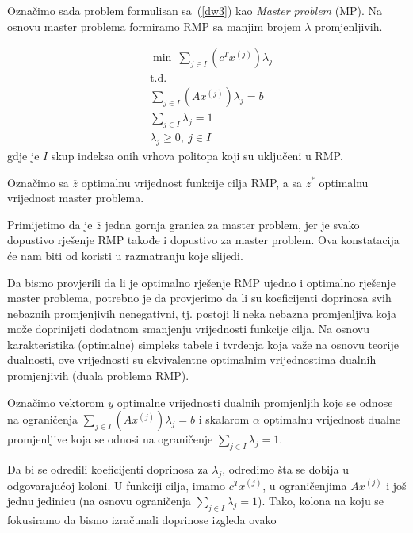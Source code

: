 \documentclass[b5paper, utf8, 11pt, colorlinks]{book}
\theoremstyle{definition}
\begin{document}
 Označimo sada problem formulisan  sa~(\ref{dw3}) kao \emph{Master problem} (MP). Na osnovu master problema formiramo RMP sa manjim brojem $\lambda$ promjenljivih.
 
     \begin{equation}
 	\begin{aligned}\label{dw4}
 		&\min\   \sum_{j\in I}(c^T x^{(j)})\lambda_j\\
 		&\mbox{t.d.}\\ 
 		 &\sum_{j\in I} (A x^{(j)})\lambda_j=b\\
 		&\sum_{j\in I}\lambda_j = 1\\
 		&\lambda_j\geqslant 0,\ j  \in I
 	\end{aligned}
 \end{equation}
gdje je $I$ skup indeksa onih vrhova politopa koji su uključeni u RMP.

Označimo sa $\overline{z}$ optimalnu vrijednost funkcije cilja RMP, a sa $z^*$ optimalnu vrijednost master problema.

Primijetimo da je $\overline{z}$ jedna gornja granica za master problem, jer je svako dopustivo rješenje RMP takođe i dopustivo za master problem. Ova konstatacija će nam biti od koristi u razmatranju koje slijedi.

Da bismo provjerili da li je optimalno rješenje RMP ujedno i optimalno rješenje master problema, potrebno je da provjerimo da li su koeficijenti doprinosa svih nebaznih promjenjivih nenegativni, tj. postoji li neka nebazna promjenljiva koja može doprinijeti dodatnom smanjenju vrijednosti funkcije cilja. Na osnovu karakteristika (optimalne) simpleks tabele i tvrđenja koja važe na osnovu teorije dualnosti, ove vrijednosti su ekvivalentne optimalnim vrijednostima dualnih promjenjivih (duala problema RMP).   



Označimo vektorom $y$ optimalne vrijednosti dualnih promjenljih koje se odnose na ograničenja $\sum_{j\in I} (A x^{(j)})\lambda_j=b$ i skalarom $\alpha$ optimalnu vrijednost dualne promjenljive koja se odnosi na ograničenje $\sum_{j\in I}\lambda_j = 1$. 

Da bi se odredili   koeficijenti doprinosa za $\lambda_j$, odredimo šta se dobija u odgovarajućoj koloni. U funkciji cilja, imamo $c^Tx^{(j)}$, u ograničenjima $A x^{(j)} $ i još jednu jedinicu (na osnovu ograničenja $\sum_{j\in I}\lambda_j = 1$). Tako, kolona na koju se fokusiramo da bismo izračunali doprinose izgleda ovako
\end{document}
